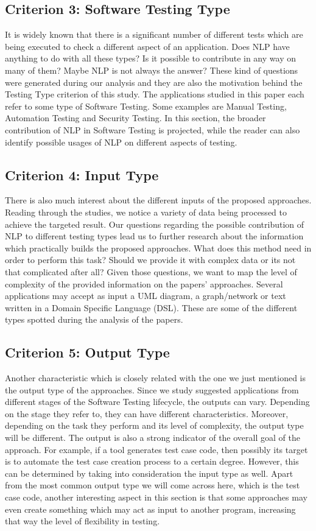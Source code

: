 \subsection {Criterion 3: Software Testing Type}
It is widely known that there is a significant number of different tests which are being executed to check a different aspect of an application. Does NLP have anything to do with all these types? Is it possible to 
contribute in any way on many of them? Maybe NLP is not always the answer? These kind of questions were generated during our analysis and they are also the motivation behind the Testing Type criterion of this study. 
The applications studied in this paper each refer to some type of Software Testing. Some examples are Manual Testing, Automation Testing and Security Testing. 
In this section, the broader contribution of NLP in Software Testing is projected, while the reader can also identify possible usages of NLP on different aspects of testing.

\subsection {Criterion 4: Input Type}
There is also much interest about the different inputs of the proposed approaches. Reading through the studies, we notice a variety of data  
being processed to achieve the targeted result. Our questions regarding the possible contribution of NLP to different testing types lead us to further research about the information which practically builds 
the proposed approaches. What does this method need in order to perform this task? Should we provide it with complex data or its not that complicated after all? Given those questions, we want to map the level of 
complexity of the provided information on the papers' approaches. Several applications may accept as input a UML 
diagram, a graph/network or text written in a Domain Specific Language (DSL). These are some of the different types spotted during the analysis of the papers.

\subsection {Criterion 5: Output Type}
Another characteristic which is closely related with the one we just mentioned is the output type of the approaches. Since we study suggested applications 
from different stages of the Software Testing lifecycle, the outputs can vary. Depending on the stage they refer to, they can have different characteristics. Moreover, depending on the task they perform and its 
level of complexity, the output type will be different. The output is also a strong indicator of the overall goal of the approach. For example, if a tool generates test case code, then possibly its target is to 
automate the test case creation process to a certain degree. However, this can be determined by taking into consideration the input type as well. Apart from the most common output type we will come across here, which is the 
test case code, another interesting aspect in this section is that some approaches may even create something which may act as input to another program, increasing that way the level of flexibility in testing.

